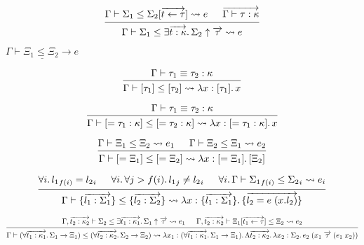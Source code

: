 \documentclass[lualatex,12pt,unicode]{article}
\begin{document}
\pagestyle{empty}

\[
    \begin{prooftree}
        \hypo{\Gamma \vdash \Sigma_1 \leq \Sigma_2[\overrightarrow{t \leftarrow \tau}] \rightsquigarrow e}
        \hypo{\overrightarrow{\Gamma \vdash \tau: \kappa}}
        \infer2{\Gamma \vdash \Sigma_1 \leq \exists \overrightarrow{t: \kappa}\ldotp \Sigma_2 \uparrow \overrightarrow{\tau} \rightsquigarrow e}
    \end{prooftree}
\]

$\underline{\Gamma \vdash \Xi_1 \leq \Xi_2 \rightarrow e}$

\[
    \begin{prooftree}
        \hypo{\Gamma \vdash \tau_1 \equiv \tau_2: \kappa}
        \infer1{\Gamma \vdash [\tau_1] \leq [\tau_2] \rightsquigarrow \lambda x: [\tau_1]\ldotp x}
    \end{prooftree}
\]

\[
    \begin{prooftree}
        \hypo{\Gamma \vdash \tau_1 \equiv \tau_2: \kappa}
        \infer1{\Gamma \vdash [= \tau_1: \kappa] \leq [= \tau_2: \kappa] \rightsquigarrow \lambda x: [= \tau_1: \kappa]\ldotp x}
    \end{prooftree}
\]

\[
    \begin{prooftree}
        \hypo{\Gamma \vdash \Xi_1 \leq \Xi_2 \rightsquigarrow e_1}
        \hypo{\Gamma \vdash \Xi_2 \leq \Xi_1 \rightsquigarrow e_2}
        \infer2{\Gamma \vdash [= \Xi_1] \leq [= \Xi_2] \rightsquigarrow \lambda x: [= \Xi_1]\ldotp [\Xi_2]}
    \end{prooftree}
\]

\[
    \begin{prooftree}
        \hypo{\forall i\ldotp {l_1}_{f(i)} = {l_2}_i}
        \hypo{\forall i\ldotp \forall j > f(i)\ldotp {l_1}_{j} \neq {l_2}_{i}}
        \hypo{\forall i\ldotp \Gamma \vdash {\Sigma_1}_{f(i)} \leq {\Sigma_2}_i \rightsquigarrow e_i}
        \infer3{\Gamma \vdash \{\overrightarrow{l_1: \Sigma_1}\} \leq \{\overrightarrow{l_2: \Sigma_2}\} \rightsquigarrow \lambda x: \{\overrightarrow{l_1: \Sigma_1}\}\ldotp \{\overrightarrow{l_2 = e\; (x.{l_2})}\}}
    \end{prooftree}
\]

\[
    \begin{prooftree}
        \hypo{\Gamma, \overrightarrow{t_2: \kappa_2} \vdash \Sigma_2 \leq \exists \overrightarrow{t_1: \kappa_1}\ldotp \Sigma_1 \uparrow \overrightarrow{\tau} \rightsquigarrow e_1}
        \hypo{\Gamma, \overrightarrow{t_2: \kappa_2} \vdash \Xi_1[\overrightarrow{t_1 \leftarrow \tau}] \leq \Xi_2 \rightsquigarrow e_2}
        \infer2{\Gamma \vdash (\forall \overrightarrow{t_1: \kappa_1}\ldotp \Sigma_1 \to \Xi_1) \leq (\forall \overrightarrow{t_2: \kappa_2}\ldotp \Sigma_2 \to \Xi_2) \rightsquigarrow \lambda x_1: (\forall \overrightarrow{t_1: \kappa_1}\ldotp \Sigma_1 \to \Xi_1)\ldotp \Lambda \overrightarrow{t_2: \kappa_2}\ldotp \lambda x_2: \Sigma_2\ldotp e_2\; (x_1\; \overrightarrow{\tau}\; (e_1\; x_2))}
    \end{prooftree}
\]
\end{document}
